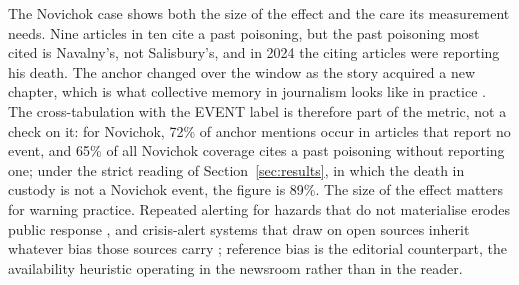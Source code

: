 \documentclass[1p,times]{elsarticle}
\begin{document}
The Novichok case shows both the size of the effect and the care its measurement needs. Nine articles in ten cite a past poisoning, but the past poisoning most cited is Navalny's, not Salisbury's, and in 2024 the citing articles were reporting his death. The anchor changed over the window as the story acquired a new chapter, which is what collective memory in journalism looks like in practice \cite{edy1999}. The cross-tabulation with the EVENT label is therefore part of the metric, not a check on it: for Novichok, 72\% of anchor mentions occur in articles that report no event, and 65\% of all Novichok coverage cites a past poisoning without reporting one; under the strict reading of Section~\ref{sec:results}, in which the death in custody is not a Novichok event, the figure is 89\%. The size of the effect matters for warning practice. Repeated alerting for hazards that do not materialise erodes public response \cite{sutton2025}, and crisis-alert systems that draw on open sources inherit whatever bias those sources carry \cite{brynielsson2017}; reference bias is the editorial counterpart, the availability heuristic \cite{tversky1973} operating in the newsroom rather than in the reader.
\end{document}
